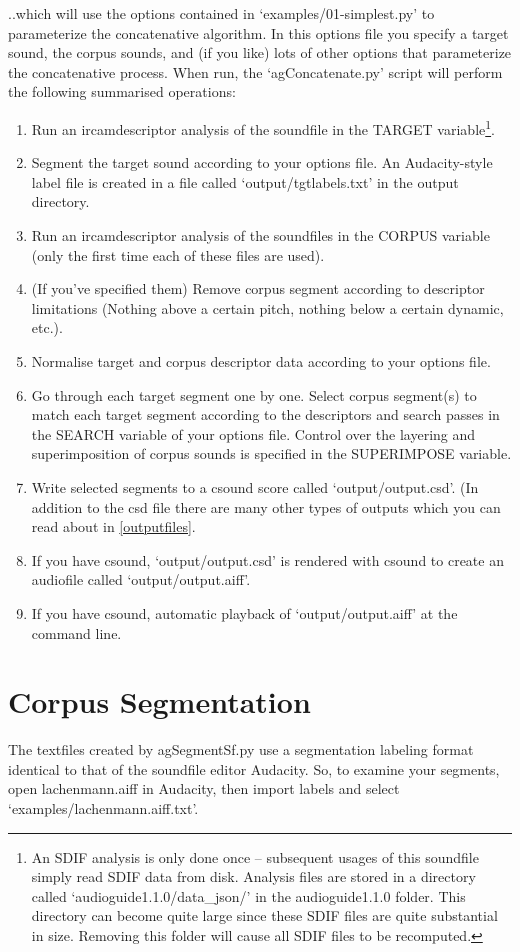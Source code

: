 \documentclass{article}
\newcommand{\ag}{audioguide1.1.0\xspace}
\begin{document}
\begin{spacing}{1.2}
..which will use the options contained in `examples/01-simplest.py' to parameterize the concatenative algorithm.  In this options file you specify a target sound, the corpus sounds, and (if you like) lots of other options that parameterize the concatenative process.  When run, the `agConcatenate.py' script will perform the following summarised operations:
\begin{enumerate}
\item Run an ircamdescriptor analysis of the soundfile in the TARGET variable\footnote{An SDIF analysis is only done once -- subsequent usages of this soundfile simply read SDIF data from disk.  Analysis files are stored in a directory called `\ag/data\_json/' in the \ag folder.  This directory can become quite large since these SDIF files are quite substantial in size.  Removing this folder will cause all SDIF files to be recomputed.}.  
\item Segment the target sound according to your options file.  An Audacity-style label file is created in a file called `output/tgtlabels.txt' in the output directory.
\item Run an ircamdescriptor analysis of the soundfiles in the CORPUS variable (only the first time each of these files are used).
\item (If you've specified them) Remove corpus segment according to descriptor limitations (Nothing above a certain pitch, nothing below a certain dynamic, etc.).
\item Normalise target and corpus descriptor data according to your options file.
\item Go through each target segment one by one.  Select corpus segment(s) to match each target segment according to the descriptors and search passes in the SEARCH variable of your options file.  Control over the layering and superimposition of corpus sounds is specified in the SUPERIMPOSE variable.
\item Write selected segments to a csound score called `output/output.csd'.  (In addition to the csd file there are many other types of outputs which you can read about in \ref{outputfiles}.
\item If you have csound, `output/output.csd' is rendered with csound to create an audiofile called `output/output.aiff'.
\item If you have csound, automatic playback of `output/output.aiff' at the command line.
\end{enumerate}


\section{Corpus Segmentation}\label{segmentation}
The textfiles created by agSegmentSf.py use a segmentation labeling format identical to that of the soundfile editor Audacity.  So, to examine your segments, open lachenmann.aiff in Audacity, then import labels and select `examples/lachenmann.aiff.txt'.


\end{spacing}
\end{document}
